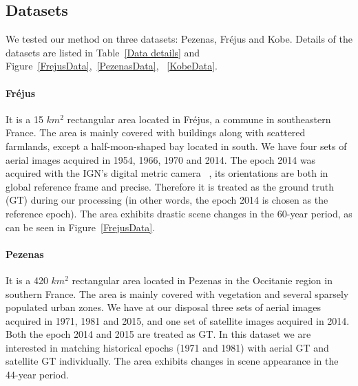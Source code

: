 \subsection{Datasets}
We tested our method on three datasets: Pezenas, Fr{\'e}jus and Kobe. Details of the datasets are listed in Table~\ref{Data details} and Figure~\ref{FrejusData},~\ref{PezenasData}, ~\ref{KobeData}.
\par
\paragraph{Fr{\'e}jus} It is a 15 $km^2$ rectangular area located in Fr{\'e}jus, a commune in southeastern France. The area is mainly covered with buildings along with scattered farmlands, except a half-moon-shaped bay located in south. We have four sets of aerial images acquired in 1954, 1966, 1970 and 2014. The epoch 2014 was acquired with the IGN's digital metric camera ~\cite{souchon2010ign}, its orientations are both in global reference frame and precise. Therefore it is treated as the ground truth (GT) during our processing (in other words, the epoch 2014 is chosen as the reference epoch). 
The area exhibits drastic scene changes in the 60-year period, as can be seen in Figure~\ref{FrejusData}.\\
\paragraph{Pezenas} It is a 420 $km^2$ rectangular area located in Pezenas in the Occitanie region in southern France. The area is mainly covered with vegetation and several sparsely populated urban zones. We have at our disposal three sets of aerial images acquired in 1971, 1981 and 2015, and one set of satellite images acquired in 2014. Both the epoch 2014 and 2015 are treated as GT. In this dataset we are interested in matching historical epochs (1971 and 1981) with aerial GT and satellite GT individually. The area exhibits changes in scene appearance in the 44-year period.\\

